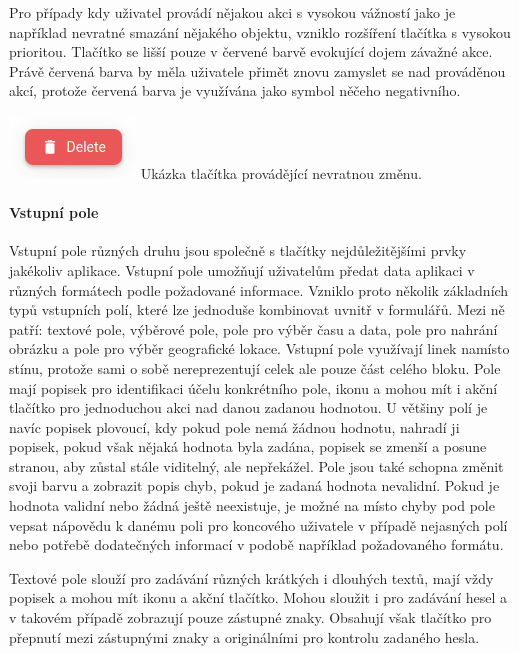 \begin{itemize}
\begin{itemize}
			Pro případy kdy uživatel provádí nějakou akci s vysokou vážností jako je například nevratné smazání nějakého
			objektu, vzniklo rozšíření tlačítka s vysokou prioritou.
			Tlačítko se lišší pouze v červené barvě evokující dojem závažné akce.
			Právě červená barva by měla uživatele přimět znovu zamyslet se nad prováděnou akcí, protože červená barva
			je využívána jako symbol něčeho negativního.

			\includegraphics[width=0.24\linewidth]{obrazky/tlacitko_s_velkou_prioritou_a_velkou_vaznosti}\hfill
			Ukázka tlačítka provádějící nevratnou změnu. %

			\paragraph{Vstupní pole}

			Vstupní pole různých druhu jsou společně s tlačítky nejdůležitějšími prvky jakékoliv aplikace.
			Vstupní pole umožňují uživatelům předat data aplikaci v různých formátech podle požadované informace.
			Vzniklo proto několik základních typů vstupních polí, které lze jednoduše kombinovat uvnitř v formulářů.
			Mezi ně patří: textové pole, výběrové pole, pole pro výběr času a data, pole pro nahrání obrázku a pole pro
			výběr geografické lokace.
			Vstupní pole využívají linek namísto stínu, protože sami o sobě nereprezentují celek ale pouze část celého
			bloku.
			Pole mají popisek pro identifikaci účelu konkrétního pole, ikonu a mohou mít i akční tlačítko pro jednoduchou
			akci nad danou zadanou hodnotou.
			U většiny polí je navíc popisek plovoucí, kdy pokud pole nemá žádnou hodnotu, nahradí ji popisek, pokud však
			nějaká hodnota byla zadána, popisek se zmenší a posune stranou, aby zůstal stále viditelný, ale nepřekážel.
			Pole jsou také schopna změnit svoji barvu a zobrazit popis chyb, pokud je zadaná hodnota nevalidní.
			Pokud je hodnota validní nebo žádná ještě neexistuje, je možné na místo chyby pod pole vepsat nápovědu k danému
			poli pro koncového uživatele v případě nejasných polí nebo potřebě dodatečných informací v podobě například
			požadovaného formátu.

			Textové pole slouží pro zadávání různých krátkých i dlouhých textů, mají vždy popisek a mohou mít ikonu a
			akční tlačítko.
			Mohou sloužit i pro zadávání hesel a v takovém případě zobrazují pouze zástupné znaky.
			Obsahují však tlačítko pro přepnutí mezi zástupnými znaky a originálními pro kontrolu zadaného hesla.


\end{itemize}
\end{itemize}
